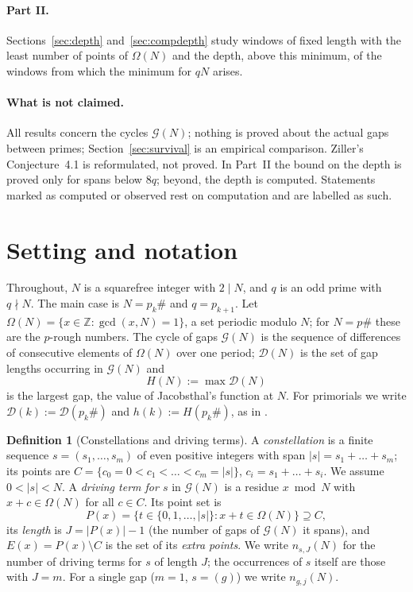 \documentclass[11pt]{article}
\theoremstyle{definition}
\newtheorem{definition}[theorem]{Definition}
\theoremstyle{remark}
\newcommand{\G}{\mathcal{G}}
\newcommand{\D}{\mathcal{D}}
\begin{document}
\paragraph{Part II.} Sections~\ref{sec:depth} and~\ref{sec:compdepth} study windows of fixed length with the least number of points of $\Omega(N)$ and the depth, above this minimum, of the windows from which the minimum for $qN$ arises.

\paragraph{What is not claimed.} All results concern the cycles $\G(N)$; nothing is proved about the actual gaps between primes; Section~\ref{sec:survival} is an empirical comparison. Ziller's Conjecture~4.1 \cite{Zi20} is reformulated, not proved. In Part~II the bound on the depth is proved only for spans below $8q$; beyond, the depth is computed. Statements marked as computed or observed rest on computation and are labelled as such.

\section{Setting and notation}\label{sec:setting}

Throughout, $N$ is a squarefree integer with $2 \mid N$, and $q$ is an odd prime with $q \nmid N$. The main case is $N = p_k\#$ and $q = p_{k+1}$. Let $\Omega(N) = \{x \in \mathbb{Z} : \gcd(x,N) = 1\}$, a set periodic modulo $N$; for $N = p\#$ these are the $p$-rough numbers. The cycle of gaps $\G(N)$ is the sequence of differences of consecutive elements of $\Omega(N)$ over one period; $\D(N)$ is the set of gap lengths occurring in $\G(N)$ and
\[
  H(N) := \max \D(N)
\]
is the largest gap, the value of Jacobsthal's function at $N$. For primorials we write $\D(k) := \D(p_k\#)$ and $h(k) := H(p_k\#)$, as in \cite{Zi20}.

\begin{definition}[Constellations and driving terms]
A \emph{constellation} is a finite sequence $s = (s_1,\dots,s_m)$ of even positive integers with span $|s| = s_1+\dots+s_m$; its points are $C = \{c_0 = 0 < c_1 < \dots < c_m = |s|\}$, $c_i = s_1 + \dots + s_i$. We assume $0 < |s| < N$. A \emph{driving term for $s$} in $\G(N)$ is a residue $x \bmod N$ with $x + c \in \Omega(N)$ for all $c \in C$. Its point set is
\[
  P(x) = \{ t \in \{0, 1, \dots, |s|\} : x + t \in \Omega(N) \} \supseteq C,
\]
its \emph{length} is $J = |P(x)| - 1$ (the number of gaps of $\G(N)$ it spans), and $E(x) = P(x) \setminus C$ is the set of its \emph{extra points}. We write $n_{s,J}(N)$ for the number of driving terms for $s$ of length $J$; the occurrences of $s$ itself are those with $J = m$. For a single gap ($m = 1$, $s = (g)$) we write $n_{g,j}(N)$.
\end{definition}
\end{document}

